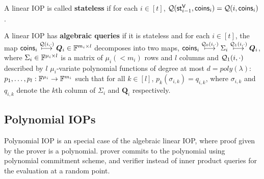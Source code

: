 \documentclass[runningheads]{llncs}
\def\verifier{\mathsf{V}}
\def\coins{\mathsf{coins}}
\begin{document}
A linear IOP is called \textbf{stateless} if for each $i\in [t]$, $\calQ(\st^{\verifier}_{i-1}, \coins_i) = \calQ(i,\coins_i)$.

A linear IOP has \textbf{algebraic queries} if it is stateless and for each $i\in[t]$, the map $\coins_i \stackrel{\calQ(i,\cdot)}{\longmapsto} \bm{Q}_i \in \bbF^{m_i \times l}$ decomposes into two maps, $\coins_i \stackrel{\calQ_0(i,\cdot)}{\longmapsto} \Sigma_i \stackrel{\calQ_1(i,\cdot)}{\longmapsto} \bm{Q}_i$, where $\Sigma_i \in \mathbb{F}^{\mu_i\times l}$ is a matrix of $\mu_i ( < m_i)$ rows and $l$ columns and $\mathcal{Q}_1(i,\cdot)$ described by $l$ $\mu_i$-variate polynomial functions of degree at most $d = poly(\lambda)$: $p_1,\ldots, p_l: \mathbb{F}^{\mu_i}\rightarrow \mathbb{F}^{m_i}$ such that for all $k\in[l]$, $p_k(\sigma_{i,k})=q_{i,k}$, where $\sigma_{i,k}$ and $q_{i,k}$ denote the $k$th column of $\Sigma_i$ and $\bm{Q}_i$ respectively.


\subsection{Polynomial IOPs}
Polynomial IOP is an special case of the algebraic linear IOP, where proof given by the prover is a polynomial. prover commits to the polynomial using polynomial commitment scheme, and verifier instead of inner product queries for the evaluation at a random point.
\end{document}
